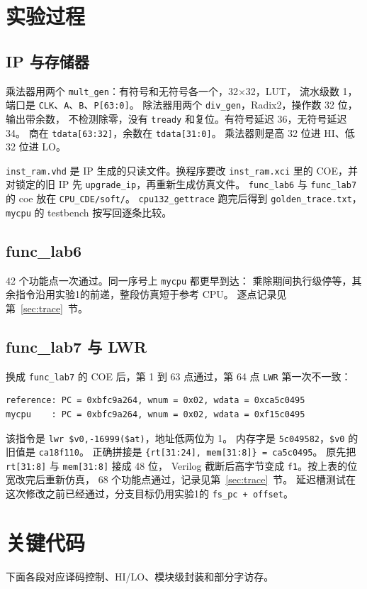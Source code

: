 \documentclass{article}
\begin{document}
\section{实验过程}
\subsection{IP 与存储器}
乘法器用两个 \texttt{mult\_gen}：有符号和无符号各一个，32$\times$32，LUT，
流水级数 1，端口是 \texttt{CLK}、\texttt{A}、\texttt{B}、\texttt{P[63:0]}。
除法器用两个 \texttt{div\_gen}，Radix2，操作数 32 位，输出带余数，
不检测除零，没有 \texttt{tready} 和复位。有符号延迟 36，无符号延迟 34。
商在 \texttt{tdata[63:32]}，余数在 \texttt{tdata[31:0]}。
乘法器则是高 32 位进 HI、低 32 位进 LO。

\texttt{inst\_ram.vhd} 是 IP 生成的只读文件。换程序要改 \texttt{inst\_ram.xci}
里的 COE，并对锁定的旧 IP 先 \texttt{upgrade\_ip}，再重新生成仿真文件。
\texttt{func\_lab6} 与 \texttt{func\_lab7} 的 coe 放在 \texttt{CPU\_CDE/soft/}。
\texttt{cpu132\_gettrace} 跑完后得到 \texttt{golden\_trace.txt}，
\texttt{mycpu} 的 testbench 按写回逐条比较。

\subsection{func\_lab6}
42 个功能点一次通过。同一序号上 \texttt{mycpu} 都更早到达：
乘除期间执行级停等，其余指令沿用实验1的前递，整段仿真短于参考 CPU。
逐点记录见第~\ref{sec:trace}~节。

\subsection{func\_lab7 与 LWR}
换成 \texttt{func\_lab7} 的 COE 后，第 1 到 63 点通过，第 64 点 \texttt{LWR} 第一次不一致：
\begin{verbatim}
reference: PC = 0xbfc9a264, wnum = 0x02, wdata = 0xca5c0495
mycpu    : PC = 0xbfc9a264, wnum = 0x02, wdata = 0xf15c0495
\end{verbatim}
该指令是 \texttt{lwr \$v0,-16999(\$at)}，地址低两位为 1。
内存字是 \texttt{5c049582}，\texttt{\$v0} 的旧值是 \texttt{ca18f110}。
正确拼接是 \texttt{\{rt[31:24], mem[31:8]\} = ca5c0495}。
原先把 \texttt{rt[31:8]} 与 \texttt{mem[31:8]} 接成 48 位，
Verilog 截断后高字节变成 \texttt{f1}。按上表的位宽改完后重新仿真，
68 个功能点通过，记录见第~\ref{sec:trace}~节。
延迟槽测试在这次修改之前已经通过，分支目标仍用实验1的 \texttt{fs\_pc + offset}。

\section{关键代码}
下面各段对应译码控制、HI/LO、模块级封装和部分字访存。
\end{document}
